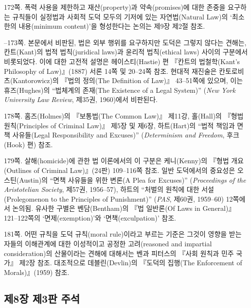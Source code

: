 {\noteentry 172쪽.  폭력 사용을 제한하고
재산(property)과 약속(promises)에 대한 존중을 요구하는 규칙들이 실정법과
사회적 도덕 모두의 기저에 있는 자연법(Natural Law)의 ‘최소한의
내용(minimum content)’을 형성한다는 논의는 제9장 제2절 참조.

--173쪽.  본문에서 비판된, 법은 외부 행위를
요구하지만 도덕은 그렇지 않다는 견해는, 칸트(Kant)의 법적 법칙(juridical
laws)과 윤리적 법칙(ethical laws) 사이의 구분에서 비롯되었다. 이에 대한
고전적 설명은 헤이스티(Hastie) 편 『칸트의 법철학(Kant's Philosophy of
Law)』(1887) 서론 14쪽 및 20--24쪽 참조. 현대적 재진술은
칸토로비츠(Kantorowicz)의 『법의 정의(The Definition of Law)』
43--51쪽에 있으며, 이는 휴즈(Hughes)의 “법체계의 존재(The Existence of
a Legal System)” (\emph{New York University Law Review}, 제35권,
1960)에서 비판된다.

\noteentry 178쪽.  홈즈(Holmes)의 『보통법(The
Common Law)』 제11강, 홀(Hall)의 『형법 원칙(Principles of Criminal
Law)』 제5장 및 제6장, 하트(Hart)의 “법적 책임과 면책 사유들(Legal
Responsibility and Excuses)” (\emph{Determinism and Freedom},
후크(Hook) 편) 참조.

\noteentry 179쪽.  살해(homicide)에 관한 법 이론에서의 이 구분은 케니(Kenny)의 『형법
개요(Outlines of Criminal Law)』(24판) 109--116쪽 참조. 일반 도덕에서의
중요성은 오스틴(Austin)의 “면책 사유들을 위한 변론(A Plea for
Excuses)” (\emph{Proceedings of the Aristotelian Society}, 제57권,
1956--57), 하트의 “처벌의 원칙에 대한 서설(Prolegomenon to the
Principles of Punishment)” (\emph{PAS}, 제60권, 1959--60) 12쪽에서
논의됨. 유사한 구별은 벤담(Bentham)의 『법 일반론(Of Laws in General)』
121--122쪽의 ‘면제(exemption)’와 ‘면책(exculpation)’ 참조.

\noteentry 181쪽.  어떤 규칙을 도덕 규칙(moral
rule)이라고 부르는 기준은 그것이 영향을 받는 자들의 이해관계에 대한
이성적이고 공정한 고려(reasoned and impartial consideration)의
산물이라는 견해에 대해서는 벤과 피터스의 『사회 원칙과 민주 국가』 제2장
참조. 대조적으로 데블린(Devlin)의 『도덕의 집행(The Enforcement of
Morals)』(1959) 참조.

\subsection{제8장 제3판
주석}\label{uxc81c8uxc7a5-uxc81c3uxd310-uxc8fcuxc11d}

}

